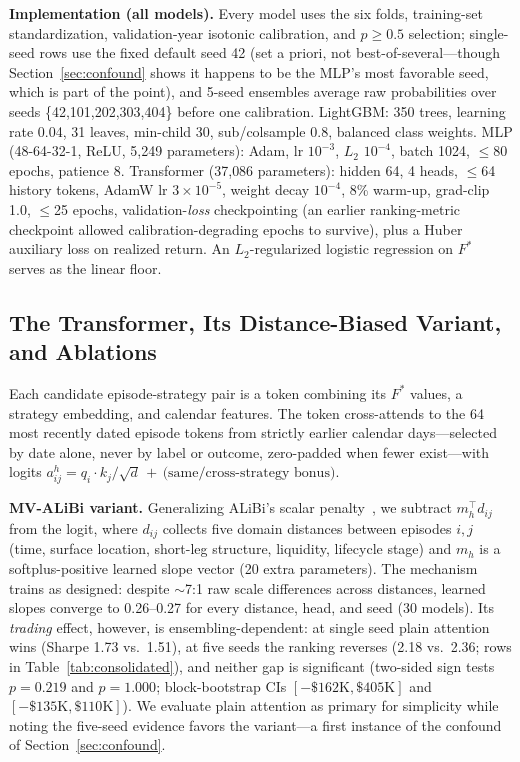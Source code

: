 \documentclass[sigconf,review]{acmart}
\begin{document}
\noindent\textbf{Implementation (all models).} Every model uses the six folds, training-set standardization, validation-year isotonic calibration, and $p\ge0.5$ selection; single-seed rows use the fixed default seed 42 (set a priori, not best-of-several---though Section~\ref{sec:confound} shows it happens to be the MLP's most favorable seed, which is part of the point), and 5-seed ensembles average raw probabilities over seeds \{42,101,202,303,404\} before one calibration. LightGBM: 350 trees, learning rate 0.04, 31 leaves, min-child 30, sub/colsample 0.8, balanced class weights. MLP (48-64-32-1, ReLU, 5{,}249 parameters): Adam, lr $10^{-3}$, $L_2$ $10^{-4}$, batch 1024, $\le$80 epochs, patience 8. Transformer (37{,}086 parameters): hidden 64, 4 heads, $\le$64 history tokens, AdamW lr $3{\times}10^{-5}$, weight decay $10^{-4}$, 8\% warm-up, grad-clip 1.0, $\le$25 epochs, validation-\emph{loss} checkpointing (an earlier ranking-metric checkpoint allowed calibration-degrading epochs to survive), plus a Huber auxiliary loss on realized return. An $L_2$-regularized logistic regression on $F^{\ast}$ serves as the linear floor.

\subsection{The Transformer, Its Distance-Biased Variant, and Ablations}
\label{sec:transformer}
Each candidate episode-strategy pair is a token combining its $F^{\ast}$ values, a strategy embedding, and calendar features. The token cross-attends to the 64 most recently dated episode tokens from strictly earlier calendar days---selected by date alone, never by label or outcome, zero-padded when fewer exist---with logits
$a^{h}_{ij}=q_i\!\cdot\!k_j/\sqrt{d}\,+\,\text{(same/cross-strategy bonus)}$.

\noindent\textbf{MV-ALiBi variant.} Generalizing ALiBi's scalar penalty~\cite{press2022alibi}, we subtract $m_h^{\top}d_{ij}$ from the logit, where $d_{ij}$ collects five domain distances between episodes $i,j$ (time, surface location, short-leg structure, liquidity, lifecycle stage) and $m_h$ is a softplus-positive learned slope vector (20 extra parameters). The mechanism trains as designed: despite $\sim$7:1 raw scale differences across distances, learned slopes converge to 0.26--0.27 for every distance, head, and seed (30 models). Its \emph{trading} effect, however, is ensembling-dependent: at single seed plain attention wins (Sharpe 1.73 vs.\ 1.51), at five seeds the ranking reverses (2.18 vs.\ 2.36; rows in Table~\ref{tab:consolidated}), and neither gap is significant (two-sided sign tests $p=0.219$ and $p=1.000$; block-bootstrap CIs $[-\$162\text{K},\$405\text{K}]$ and $[-\$135\text{K},\$110\text{K}]$). We evaluate plain attention as primary for simplicity while noting the five-seed evidence favors the variant---a first instance of the confound of Section~\ref{sec:confound}.
\end{document}
